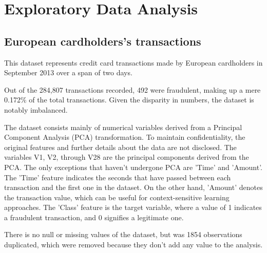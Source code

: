 \section{Exploratory Data Analysis}

\subsection{European cardholders's transactions}

This dataset represents credit card transactions made by European cardholders in September 2013 over a span of two days.

Out of the 284,807 transactions recorded, 492 were fraudulent, making up a mere 0.172\% of the total transactions. Given the disparity in numbers, the dataset is notably imbalanced.

The dataset consists mainly of numerical variables derived from a Principal Component Analysis (PCA) transformation. To maintain confidentiality, the original features and further details about the data are not disclosed. The variables V1, V2, through V28 are the principal components derived from the PCA. The only exceptions that haven't undergone PCA are 'Time' and 'Amount'. The 'Time' feature indicates the seconds that have passed between each transaction and the first one in the dataset. On the other hand, 'Amount' denotes the transaction value, which can be useful for context-sensitive learning approaches. The 'Class' feature is the target variable, where a value of 1 indicates a fraudulent transaction, and 0 signifies a legitimate one.

There is no null or missing values of the dataset, but was 1854 observations duplicated, which were removed because they don't add any value to the analysis.

